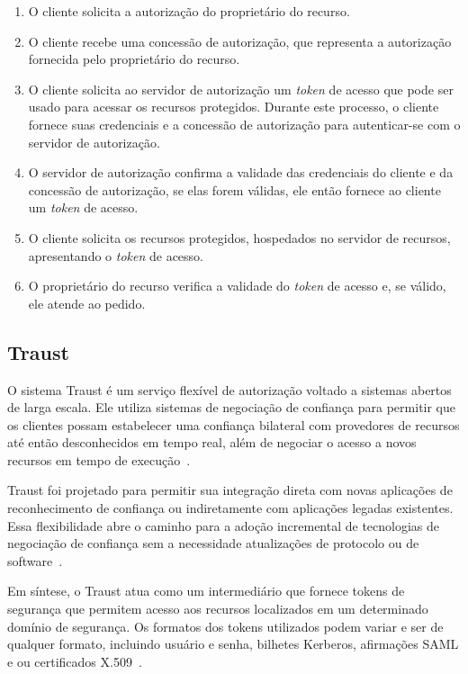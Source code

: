 \begin{enumerate}[a )]
        \item O cliente solicita a autorização do proprietário do recurso.
        \item O cliente recebe uma concessão de autorização, que representa a autorização fornecida pelo proprietário do recurso.
        \item O cliente solicita ao servidor de autorização um \emph{token} de acesso que pode ser usado para acessar os recursos protegidos. Durante este processo, o cliente fornece suas credenciais e a concessão de autorização para autenticar-se com o servidor de autorização.
        \item O servidor de autorização confirma a validade das credenciais do cliente e da concessão de autorização, se elas forem válidas, ele então fornece ao cliente um \emph{token} de acesso.
        \item O cliente solicita os recursos protegidos, hospedados no servidor de recursos, apresentando o \emph{token} de acesso.
        \item  O proprietário do recurso verifica a validade do \emph{token} de acesso e, se válido, ele atende ao pedido.

\end{enumerate}

\subsection{Traust}

O sistema Traust é um serviço flexível de autorização voltado a sistemas abertos de larga escala. Ele utiliza sistemas de negociação de confiança para permitir que os clientes possam estabelecer uma confiança bilateral com provedores de recursos até então desconhecidos em tempo real, além de negociar o acesso a novos recursos em tempo de execução~\cite{traust08}.

Traust foi projetado para permitir sua integração direta com novas aplicações de reconhecimento de confiança ou indiretamente com aplicações legadas existentes. Essa flexibilidade abre o caminho para a adoção incremental de tecnologias de negociação de confiança sem a necessidade atualizações de protocolo ou de software~\cite{traust08}.

Em síntese, o Traust atua como um intermediário que fornece tokens de segurança que permitem acesso aos recursos localizados em um determinado domínio de segurança. Os formatos dos tokens utilizados podem variar e ser de qualquer formato, incluindo usuário e senha, bilhetes Kerberos, afirmações SAML e ou certificados X.509~\cite{traust08}.


